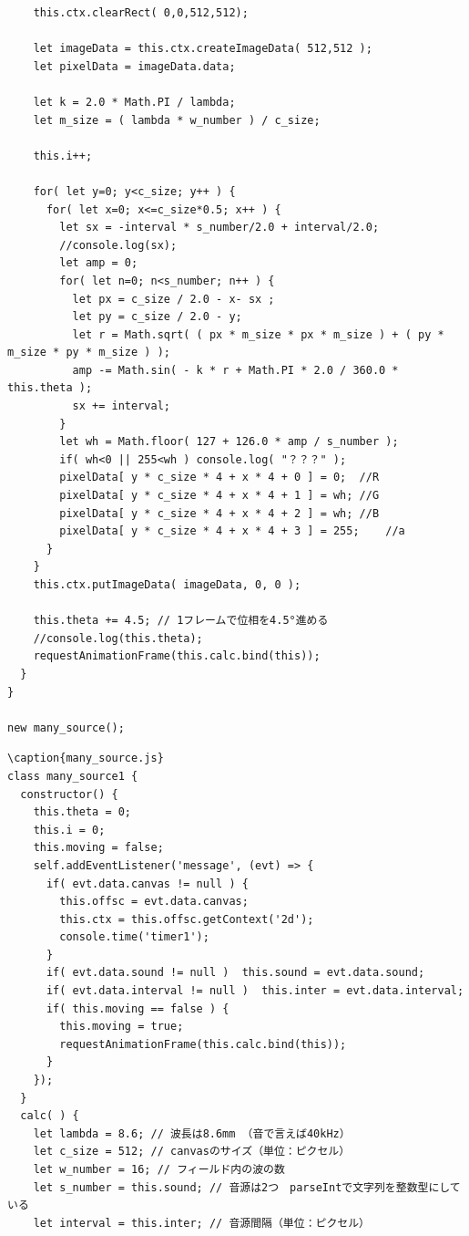\documentclass[a4j,12pt]{jsarticle}
\begin{document}
{\begin{lstlisting}
    this.ctx.clearRect( 0,0,512,512);

    let imageData = this.ctx.createImageData( 512,512 );
    let pixelData = imageData.data;

    let k = 2.0 * Math.PI / lambda;
    let m_size = ( lambda * w_number ) / c_size;

    this.i++;

    for( let y=0; y<c_size; y++ ) {
      for( let x=0; x<=c_size*0.5; x++ ) {
        let sx = -interval * s_number/2.0 + interval/2.0;
        //console.log(sx);
        let amp = 0;
        for( let n=0; n<s_number; n++ ) {
          let px = c_size / 2.0 - x- sx ;
          let py = c_size / 2.0 - y;
          let r = Math.sqrt( ( px * m_size * px * m_size ) + ( py * m_size * py * m_size ) );
          amp -= Math.sin( - k * r + Math.PI * 2.0 / 360.0 * this.theta );
          sx += interval;
        }
        let wh = Math.floor( 127 + 126.0 * amp / s_number );
        if( wh<0 || 255<wh ) console.log( "？？？" );
        pixelData[ y * c_size * 4 + x * 4 + 0 ] = 0;  //R
        pixelData[ y * c_size * 4 + x * 4 + 1 ] = wh; //G
        pixelData[ y * c_size * 4 + x * 4 + 2 ] = wh; //B
        pixelData[ y * c_size * 4 + x * 4 + 3 ] = 255;    //a
      }
    }
    this.ctx.putImageData( imageData, 0, 0 );

    this.theta += 4.5; // 1フレームで位相を4.5°進める
    //console.log(this.theta);
    requestAnimationFrame(this.calc.bind(this));
  }
}

new many_source();

\end{lstlisting}
\newpage

\begin{lstlisting}
\caption{many_source.js}
class many_source1 {
  constructor() {
    this.theta = 0;
    this.i = 0;
    this.moving = false;
    self.addEventListener('message', (evt) => {
      if( evt.data.canvas != null ) {
        this.offsc = evt.data.canvas;
        this.ctx = this.offsc.getContext('2d');
        console.time('timer1');
      }
      if( evt.data.sound != null )  this.sound = evt.data.sound;
      if( evt.data.interval != null )  this.inter = evt.data.interval;
      if( this.moving == false ) {
        this.moving = true;
        requestAnimationFrame(this.calc.bind(this));
      }
    });
  }
  calc( ) {
    let lambda = 8.6; // 波長は8.6mm （音で言えば40kHz）
    let c_size = 512; // canvasのサイズ（単位：ピクセル）
    let w_number = 16; // フィールド内の波の数
    let s_number = this.sound; // 音源は2つ　parseIntで文字列を整数型にしている
    let interval = this.inter; // 音源間隔（単位：ピクセル）


\end{lstlisting}}
\end{document}
